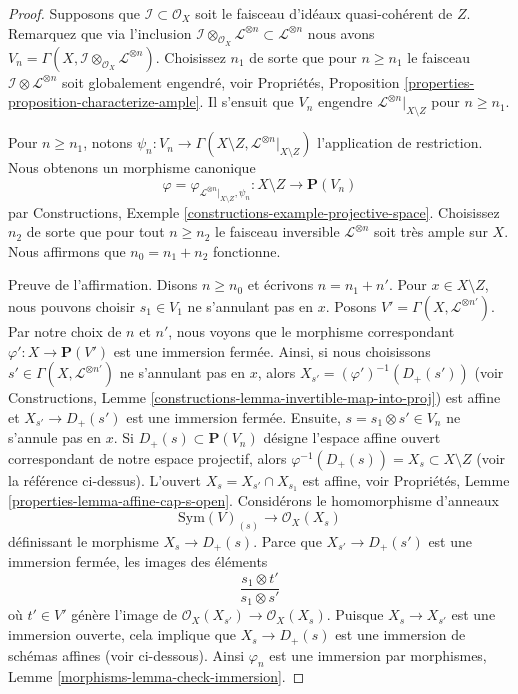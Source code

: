 \begin{proof}
Supposons que $\mathcal{I} \subset \mathcal{O}_X$ soit le
faisceau d'idéaux quasi-cohérent de $Z$. Remarquez que via
l'inclusion $\mathcal{I} \otimes_{\mathcal{O}_X}
\mathcal{L}^{\otimes n} \subset \mathcal{L}^{\otimes n}$ nous
avons $V_n = \Gamma(X, \mathcal{I} \otimes_{\mathcal{O}_X}
\mathcal{L}^{\otimes n})$. Choisissez $n_1$ de sorte que pour $n
\geq n_1$ le faisceau $\mathcal{I} \otimes \mathcal{L}^{\otimes
n}$ soit globalement engendré, voir Propriétés, Proposition
\ref{properties-proposition-characterize-ample}. Il s'ensuit que $V_n$
engendre $\mathcal{L}^{\otimes n}|_{X \setminus Z}$ pour $n \geq n_1$.

\medskip\noindent
Pour $n \geq n_1$, notons $\psi_n : V_n \to
\Gamma(X \setminus Z, \mathcal{L}^{\otimes
n}|_{X \setminus Z})$ l'application de
restriction. Nous obtenons un morphisme canonique
$$
\varphi = \varphi_{\mathcal{L}^{\otimes n}|_{X \setminus Z}, \psi_n} :
X \setminus Z
\longrightarrow
\mathbf{P}(V_n)
$$
par Constructions, Exemple
\ref{constructions-example-projective-space}. Choisissez $n_2$ de sorte
que pour tout $n \geq n_2$ le faisceau inversible $\mathcal{L}^{\otimes n}$
soit très ample sur $X$. Nous affirmons que $n_0 = n_1 + n_2$ fonctionne.

\medskip\noindent
Preuve de l'affirmation. Disons $n \geq n_0$ et écrivons $n =
n_1 + n'$. Pour $x \in X \setminus Z$, nous pouvons choisir $s_1
\in V_1$ ne s'annulant pas en $x$. Posons $V' = \Gamma(X,
\mathcal{L}^{\otimes n'})$. Par notre choix de $n$ et $n'$, nous
voyons que le morphisme correspondant $\varphi' : X \to
\mathbf{P}(V')$ est une immersion fermée. Ainsi, si nous
choisissons $s' \in \Gamma(X, \mathcal{L}^{\otimes n'})$ ne
s'annulant pas en $x$, alors $X_{s'} = (\varphi')^{-1}(D_+(s'))$
(voir Constructions, Lemme
\ref{constructions-lemma-invertible-map-into-proj}) est affine et $X_{s'}
\to D_+(s')$ est une immersion fermée. Ensuite, $s = s_1 \otimes s' \in
V_n$ ne s'annule pas en $x$. Si $D_+(s) \subset \mathbf{P}(V_n)$ désigne
l'espace affine ouvert correspondant de notre espace projectif, alors
$\varphi^{-1}(D_+(s)) = X_s \subset X \setminus Z$ (voir la référence
ci-dessus). L'ouvert $X_s = X_{s'} \cap X_{s_1}$ est affine, voir Propriétés,
Lemme \ref{properties-lemma-affine-cap-s-open}. Considérons le homomorphisme d'anneaux
$$
\text{Sym}(V)_{(s)} \longrightarrow \mathcal{O}_X(X_s)
$$
définissant le morphisme $X_s \to D_+(s)$. Parce que $X_{s'}
\to D_+(s')$ est une immersion fermée, les images des éléments
$$
\frac{s_1 \otimes t'}{s_1 \otimes s'}
$$
où $t' \in V'$ génère l'image de
$\mathcal{O}_X(X_{s'}) \to \mathcal{O}_X(X_s)$. Puisque
$X_s \to X_{s'}$ est une immersion ouverte, cela implique
que $X_s \to D_+(s)$ est une immersion de schémas affines
(voir ci-dessous). Ainsi $\varphi_n$ est une immersion par
morphismes, Lemme \ref{morphisms-lemma-check-immersion}.


\end{proof}
